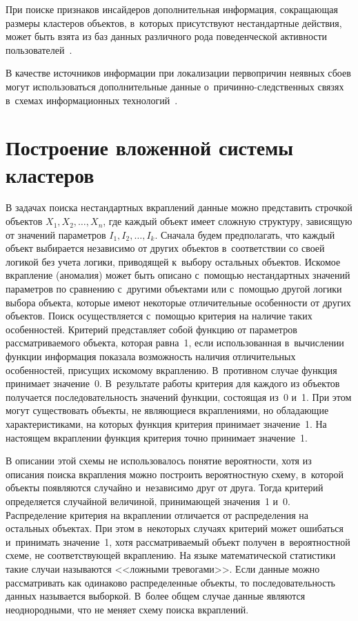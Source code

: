 \begin{multicols}{2}
  При поиске признаков инсайдеров дополнительная информация, сокращающая 
размеры клас\-те\-ров объектов, в~которых присутствуют нестандартные действия, 
может быть взята из баз данных различного рода поведенческой активности 
пользователей~\cite{14-grusho}.
  
  В качестве источников информации при локализации первопричин неявных 
сбоев могут использоваться дополнительные данные  
о~при\-чин\-но-след\-ст\-вен\-ных связях в~схемах информационных 
технологий~\cite{6-grusho}.
  
  \section{Построение вложенной системы кластеров}
  
  В задачах поиска нестандартных вкраплений данные можно представить 
строчкой объектов $X_1, X_2, \ldots , X_n$, где каждый объект имеет сложную 
структуру, зависящую от значений параметров $I_1, I_2, \ldots , I_k$. Сначала 
будем предполагать, что каж\-дый объект выбирается независимо от других 
объектов в~соответствии со своей логикой без учета логики, приводящей к~выбору 
остальных объектов. Искомое вкрапление (аномалия) может быть описано  
с~по\-мощью нестандартных значений параметров по сравнению с~другими 
объектами или с~по\-мощью другой логики выбора объекта, которые имеют 
некоторые отличительные особенности от других объектов. Поиск 
осуществляется с~помощью критерия на наличие таких особенностей. Критерий 
пред\-став\-ля\-ет собой функцию от па\-ра\-мет\-ров рассматриваемого объекта, которая 
равна~1, если использованная в~вычислении функции информация показала 
воз\-мож\-ность наличия отличительных особенностей, присущих искомому 
вкрап\-ле\-нию. В~противном случае функция принимает значение~0. В~результате 
работы критерия для каж\-до\-го из объектов получается последовательность 
значений функции, со\-сто\-ящая из~0 и~1. При этом могут существовать объекты, не 
являющиеся вкрап\-ле\-ни\-ями, но обла\-да\-ющие характеристиками, на которых 
функция критерия принимает значение~1. На настоящем вкраплении функция 
критерия точно принимает значение~1. 
  
  В описании этой схемы не использовалось понятие вероятности, хотя из 
описания поиска вкрапления можно построить вероятностную схему, в~которой 
объекты появляются случайно и~\mbox{независимо} друг от друга. Тогда критерий 
определяется случайной величиной, принимающей значения~1 и~0. 
Распределение критерия на вкраплении отличается от распределения на 
остальных объектах. При этом в~некоторых случаях критерий может ошибаться 
и~принимать значение~1, хотя рас\-смат\-ри\-ва\-емый объект получен в~вероятностной 
схеме, не соответствующей вкраплению. На языке математической статистики 
такие случаи называются <<ложными тревогами>>. Если данные можно 
рас\-смат\-ри\-вать как одинаково распределенные объекты, то последовательность 
данных называется выборкой. В~более общем случае данные являются 
неоднородными, что не меняет схему поиска вкрап\-ле\-ний. 
{

}
\end{multicols}
